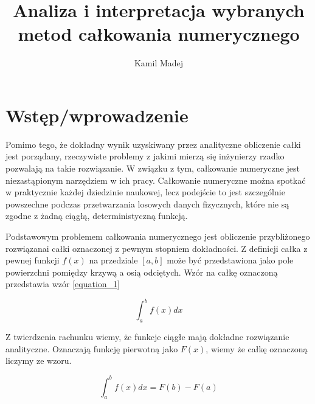 \documentclass[12pt,twoside]{article}
\author{Kamil Madej}
\title{Analiza i interpretacja wybranych metod całkowania numerycznego}
\begin{document}
\maketitle

\blankpage

\tableofcontents

\clearpage
\blankpage


\section{Wstęp/wprowadzenie}

Pomimo tego, że dokładny wynik uzyskiwany przez analityczne obliczenie całki jest porządany, rzeczywiste problemy z jakimi mierzą się inżynierzy rzadko pozwalają na takie rozwiązanie.
W związku z tym, całkowanie numeryczne jest niezastąpionym narzędziem w ich pracy. Całkowanie numeryczne można spotkać w praktycznie każdej dziedzinie naukowej, lecz podejście to jest szczególnie powszechne podczas przetwarzania losowych danych fizycznych, które nie są zgodne z żadną ciągłą, deterministyczną funkcją.

Podstawowym problemem całkowania numerycznego jest obliczenie przybliżonego rozwiązanai całki oznaczonej z pewnym stopniem dokładności.
Z definicji całka z pewnej funkcji $f(x)$ na przedziale $[a,b]$ może być przedstawiona jako pole powierzchni pomiędzy krzywą a osią odciętych. 
Wzór na całkę oznaczoną przedstawia wzór \eqref{equation_1}

\begin{equation}
\int_a^b f(x) dx
\end{equation}

Z twierdzenia rachunku wiemy, że funkcje ciągłe mają dokładne rozwiązanie analityczne. Oznaczają funkcję pierwotną jako $F(x)$, wiemy że całkę oznaczoną liczymy ze wzoru.

\begin{equation}
\int_a^b f(x)dx = F(b) - F(a)
\end{equation}\\
\end{document}
